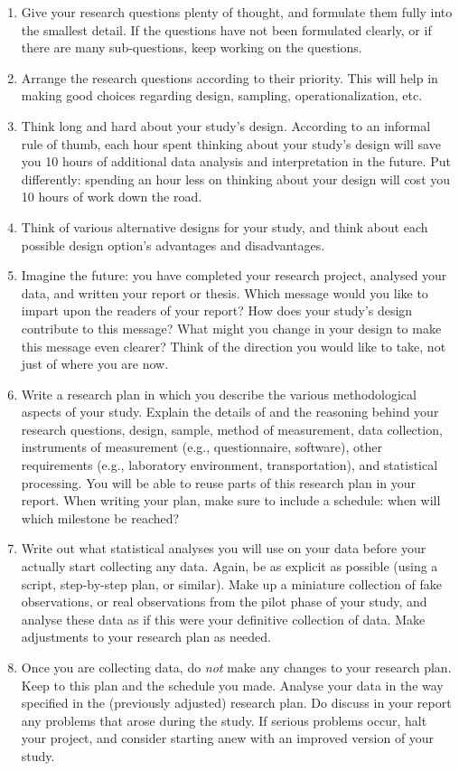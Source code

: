 \documentclass[
]{book}
\begin{document}
\begin{enumerate}
\def\labelenumi{\arabic{enumi}.}
\item
  Give your research questions plenty of thought, and formulate them fully into the smallest detail. If the questions have not been formulated clearly, or if there are many sub-questions, keep working on the questions.
\item
  Arrange the research questions according to their priority. This will help in making good choices regarding design, sampling, operationalization, etc.
\item
  Think long and hard about your study's design. According to an informal rule of thumb, each hour spent thinking about your study's design will save you 10 hours of additional data analysis and interpretation in the future. Put differently: spending an hour less on thinking about your design will cost you 10 hours of work down the road.
\item
  Think of various alternative designs for your study, and think about each possible design option's advantages and disadvantages.
\item
  Imagine the future: you have completed your research project, analysed your data, and written your report or thesis. Which message would you like to impart upon the readers of your report? How does your study's design contribute to this message? What might you change in your design to make this message even clearer? Think of the direction you would like to take, not just of where you are now.
\item
  Write a research plan in which you describe the various methodological aspects of your study. Explain the details of and the reasoning behind your research questions, design, sample, method of measurement, data collection, instruments of measurement (e.g., questionnaire, software), other requirements (e.g., laboratory environment, transportation), and statistical processing. You will be able to reuse parts of this research plan in your report. When writing your plan, make sure to include a schedule: when will which milestone be reached?
\item
  Write out what statistical analyses you will use on your data before your actually start collecting any data. Again, be as explicit as possible (using a script, step-by-step plan, or similar). Make up a miniature collection of fake observations, or real observations from the pilot phase of your study, and analyse these data as if this were your definitive collection of data. Make adjustments to your research plan as needed.
\item
  Once you are collecting data, do \emph{not} make any changes to your research plan. Keep to this plan and the schedule you made. Analyse your data in the way specified in the (previously adjusted) research plan. Do discuss in your report any problems that arose during the study. If serious problems occur, halt your project, and consider starting anew with an improved version of your study.
\end{enumerate}
\end{document}
